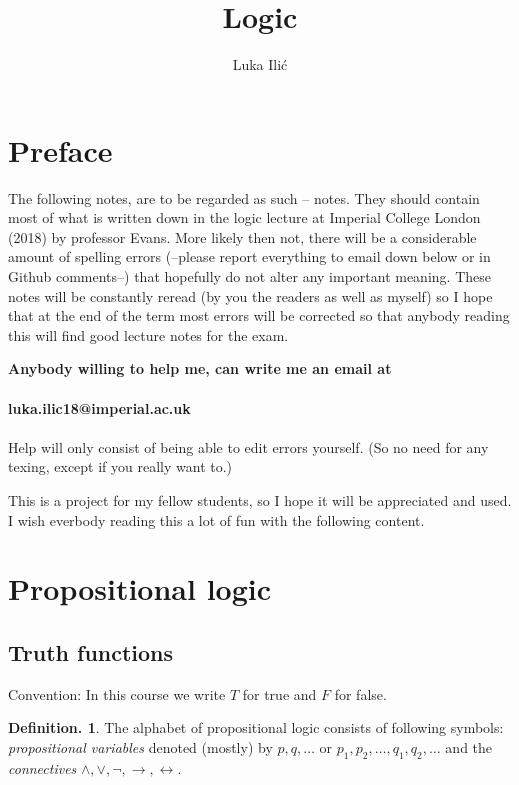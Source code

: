 \documentclass[a4paper,oneside,11pt,DIV=12,parskip=half]{scrartcl}
\title{Logic}
\author{ Luka Ili\'{c}}
\theoremstyle{plain}
\theoremstyle{definition}
\newtheorem{definition}[theorem]{Definition.}
\newtheorem{remark, definition}[theorem]{Remark and Definition.}
\newtheorem{lemma, definition}[theorem]{Lemma and Definition.}
\newtheorem{theorem, definition}[theorem]{Theorem and Definition.}
\theoremstyle{remark}
\newtheorem*{remark, example}{\textbf{Remark and Exercise}}
\begin{document}
\maketitle

\pagebreak

\tableofcontents

\pagebreak

\section*{Preface}
The following notes, are to be regarded as such -- notes. They should contain most of what is written down in the logic lecture at Imperial College London (2018) by professor Evans. More likely then not, there will be a considerable amount of spelling errors (--please report everything to email down below or in Github comments--) that hopefully do not alter any important meaning. These notes will be constantly reread (by you the readers as well as myself) so I hope that at the end of the term most errors will be corrected so that anybody reading this will find good lecture notes for the exam.

\textbf{Anybody willing to help me, can write me an email at \\
\\ luka.ilic18@imperial.ac.uk} \\ \\ Help will only consist of being able to edit errors yourself. (So no need for any texing, except if you really want to.)

This is a project for my fellow students, so I hope it will be appreciated and used. I wish everbody reading this a lot of fun with the following content.

\pagebreak

\section{Propositional logic}

\subsection{Truth functions}
Convention: In this course we write $T$ for true and $F$ for false.

\begin{definition}
	The alphabet of propositional logic consists of following symbols:
 \emph{propositional variables} denoted (mostly) by $ p,q, \dots $ or 	$p_1,p_2,\dots, q_1, q_2, \dots$
	and the \emph{connectives} $\land, \lor, \lnot, \rightarrow, \leftrightarrow$.
\end{definition}
\end{document}
